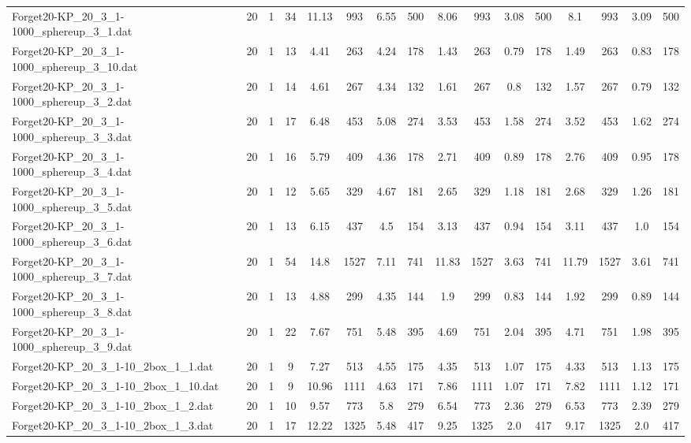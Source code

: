 \begin{sidewaystable}[!ht]
{\begin{tabular}{lccccccccccccccc}
Forget20-KP\_20\_3\_1-1000\_sphereup\_3\_1.dat & 20 & 1 & 34 & 11.13 & 993 & 6.55 & 500 & 8.06 & 993 & 3.08 & 500 & 8.1 & 993 & 3.09 & 500 \\
Forget20-KP\_20\_3\_1-1000\_sphereup\_3\_10.dat & 20 & 1 & 13 & 4.41 & 263 & 4.24 & 178 & 1.43 & 263 & 0.79 & 178 & 1.49 & 263 & 0.83 & 178 \\
Forget20-KP\_20\_3\_1-1000\_sphereup\_3\_2.dat & 20 & 1 & 14 & 4.61 & 267 & 4.34 & 132 & 1.61 & 267 & 0.8 & 132 & 1.57 & 267 &  \textcolor{blue2}{0.79} & 132 \\
Forget20-KP\_20\_3\_1-1000\_sphereup\_3\_3.dat & 20 & 1 & 17 & 6.48 & 453 & 5.08 & 274 & 3.53 & 453 & 1.58 & 274 & 3.52 & 453 & 1.62 & 274 \\
Forget20-KP\_20\_3\_1-1000\_sphereup\_3\_4.dat & 20 & 1 & 16 & 5.79 & 409 & 4.36 & 178 & 2.71 & 409 &  \textcolor{blue2}{0.89} & 178 & 2.76 & 409 & 0.95 & 178 \\
Forget20-KP\_20\_3\_1-1000\_sphereup\_3\_5.dat & 20 & 1 & 12 & 5.65 & 329 & 4.67 & 181 & 2.65 & 329 &  \textcolor{blue2}{1.18} & 181 & 2.68 & 329 & 1.26 & 181 \\
Forget20-KP\_20\_3\_1-1000\_sphereup\_3\_6.dat & 20 & 1 & 13 & 6.15 & 437 & 4.5 & 154 & 3.13 & 437 &  \textcolor{blue2}{0.94} & 154 & 3.11 & 437 & 1.0 & 154 \\
Forget20-KP\_20\_3\_1-1000\_sphereup\_3\_7.dat & 20 & 1 & 54 & 14.8 & 1527 & 7.11 & 741 & 11.83 & 1527 & 3.63 & 741 & 11.79 & 1527 & 3.61 & 741 \\
Forget20-KP\_20\_3\_1-1000\_sphereup\_3\_8.dat & 20 & 1 & 13 & 4.88 & 299 & 4.35 & 144 & 1.9 & 299 & 0.83 & 144 & 1.92 & 299 & 0.89 & 144 \\
Forget20-KP\_20\_3\_1-1000\_sphereup\_3\_9.dat & 20 & 1 & 22 & 7.67 & 751 & 5.48 & 395 & 4.69 & 751 & 2.04 & 395 & 4.71 & 751 &  \textcolor{blue2}{1.98} & 395 \\
Forget20-KP\_20\_3\_1-10\_2box\_1\_1.dat & 20 & 1 & 9 & 7.27 & 513 & 4.55 & 175 & 4.35 & 513 &  \textcolor{blue2}{1.07} & 175 & 4.33 & 513 & 1.13 & 175 \\
Forget20-KP\_20\_3\_1-10\_2box\_1\_10.dat & 20 & 1 & 9 & 10.96 & 1111 & 4.63 & 171 & 7.86 & 1111 &  \textcolor{blue2}{1.07} & 171 & 7.82 & 1111 & 1.12 & 171 \\
Forget20-KP\_20\_3\_1-10\_2box\_1\_2.dat & 20 & 1 & 10 & 9.57 & 773 & 5.8 & 279 & 6.54 & 773 & 2.36 & 279 & 6.53 & 773 & 2.39 & 279 \\
Forget20-KP\_20\_3\_1-10\_2box\_1\_3.dat & 20 & 1 & 17 & 12.22 & 1325 & 5.48 & 417 & 9.25 & 1325 & 2.0 & 417 & 9.17 & 1325 & 2.0 & 417 \\

\end{tabular}}
\end{sidewaystable}
